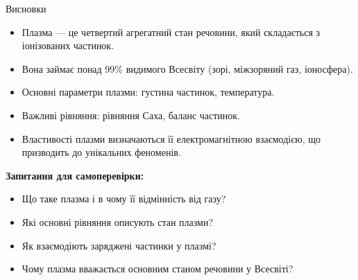 \documentclass[]{beamer}
\begin{document}
\begin{frame}{Висновки}
    \begin{block}{}
        \begin{itemize}
            \item Плазма --- це четвертий агрегатний стан речовини, який складається з іонізованих частинок.
            \item Вона займає понад 99\% видимого Всесвіту (зорі, міжзоряний газ, іоносфера).
            \item Основні параметри плазми: густина частинок, температура.
            \item Важливі рівняння: рівняння Саха, баланс частинок.
            \item Властивості плазми визначаються її електромагнітною взаємодією, що призводить до унікальних феноменів.
        \end{itemize}
    \end{block}

    \vspace{0.5cm}
    \textbf{Запитання для самоперевірки:}
    \begin{itemize}
        \item Що таке плазма і в чому її відмінність від газу?
        \item Які основні рівняння описують стан плазми?
        \item Як взаємодіють заряджені частинки у плазмі?
        \item Чому плазма вважається основним станом речовини у Всесвіті?
    \end{itemize}
\end{frame}
\end{document}
